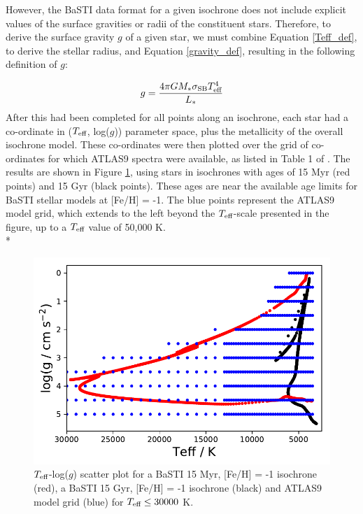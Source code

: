 \documentclass[12pt, a4paper]{report}
\begin{document}
However, the BaSTI data format for a given isochrone does not include explicit values of the surface gravities or radii of the constituent stars. Therefore, to derive the surface gravity $g$ of a given star, we must combine Equation \ref{Teff_def}, to derive the stellar radius, and Equation \ref{gravity_def}, resulting in the following definition of $g$:

\begin{equation}
\label{gravity_LT_calc}
g = \frac{4 \pi G M_{*} \sigma_{\textnormal{SB}} T_{\textnormal{eff}}^{4}}{L_{*}}
\end{equation}
After this had been completed for all points along an isochrone, each star had a co-ordinate in ($T_{\textnormal{eff}}$, log($g$)) parameter space, plus the metallicity of the overall isochrone model. These co-ordinates were then plotted over the grid of co-ordinates for which ATLAS9 spectra were available, as listed in Table 1 of \cite{2004astro.ph..5087C}. The results are shown in Figure \ref{Teff-logg coverage}, using stars in isochrones with ages of 15 Myr (red points) and 15 Gyr (black points). These ages are near the available age limits for BaSTI stellar models at [Fe/H] = -1. The blue points represent the ATLAS9 model grid, which extends to the left beyond the $T_{\textnormal{eff}}$-scale presented in the figure, up to a $T_{\textnormal{eff}}$ value of 50,000 K.\\*

\begin{figure}[h!]
\begin{center}
\includegraphics[width=1.0\textwidth]{ATLAS9_grid_BaSTI_coverage_2ages_max.pdf}
\caption{$T_{\textnormal{eff}}$-log($g$) scatter plot for a BaSTI 15 Myr, [Fe/H] = -1 isochrone (red), a BaSTI 15 Gyr, [Fe/H] = -1 isochrone (black) and ATLAS9 model grid (blue) for $T_{\textnormal{eff}} \leq 30000$ K.}
\label{Teff-logg coverage}
\end{center}
\end{figure}
\end{document}
